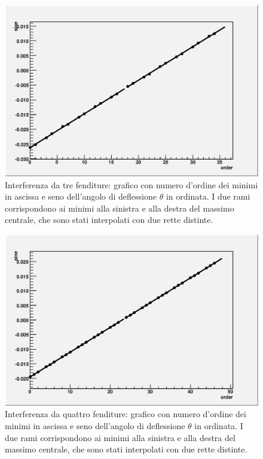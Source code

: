 \documentclass[italian,a4paper]{article}
\begin{document}
\begin{figure}[!h]\centering
\includegraphics[scale=.6]{3slits.outsin.eps}
\caption{Interferenza da tre fenditure: grafico con numero d'ordine dei minimi in ascissa e seno dell'angolo di deflessione $\theta$ in ordinata. I due rami corrispondono ai minimi alla sinistra e alla destra del massimo centrale, che sono stati interpolati con due rette distinte.}\label{3slitssin}
\end{figure}
\begin{figure}[!h]\centering
\includegraphics[scale=.6]{4slits.outsin.eps}
\caption{Interferenza da quattro fenditure: grafico con numero d'ordine dei minimi in ascissa e seno dell'angolo di deflessione $\theta$ in ordinata. I due rami corrispondono ai minimi alla sinistra e alla destra del massimo centrale, che sono stati interpolati con due rette distinte.}\label{4slitssin}
\end{figure}
\end{document}
